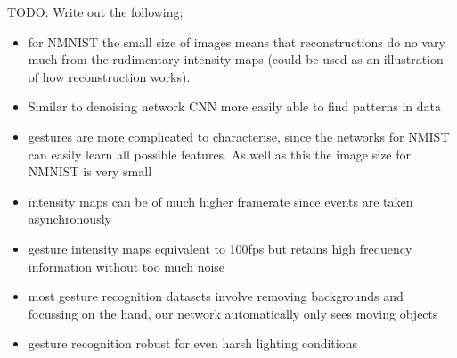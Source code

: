 \color{red} TODO: Write out the following;

\begin{itemize}
    \item for NMNIST the small size of images means that reconstructions do no vary much from the rudimentary intensity maps (could be used as an illustration of how reconstruction works).
    \item Similar to denoising network CNN more easily able to find patterns in data
    \item gestures are more complicated to characterise, since the networks for NMIST can easily learn all possible features. As well as this the image size for NMNIST is very small
    \item intensity maps can be of much higher framerate since events are taken asynchronously
    \item gesture intensity maps equivalent to 100fps but retains high frequency information without too much noise
    \item most gesture recognition datasets involve removing backgrounds and focussing on the hand, our network automatically only sees moving objects
    \item gesture recognition robust for even harsh lighting conditions
\end{itemize}

\color{black}
